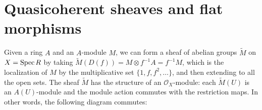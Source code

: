 \documentclass[12pt]{article}
\theoremstyle{mytheoremstyle}
\newcommand{\cO}{\mathcal{O}}
\newcommand{\spec}{\text{Spec\hspace*{.5mm}}}
\begin{document}
\section{Quasicoherent sheaves and flat morphisms}
\hspace*{8mm}Given a ring $A$ and an
$A$-module $M$, we can form a sheaf of abelian
groups $\widetilde{M}$ on $X= \spec R$ by taking $\widetilde{M}(D(f))
    = M\otimes f^{-1}A = f^{-1}M$, which is the localization of $M$ by the
multiplicative set $\{1,f,f^2,\ldots\}$, and then extending to
all the open sets. The sheaf $\widetilde{M}$
has the structure of an $\cO_X$-module: each $\widetilde{M}(U)$ is
an $A(U)$-module and the module action commutes with the restriction maps.
In other words, the following diagram commutes:

\vspace*{3mm}
\end{document}

